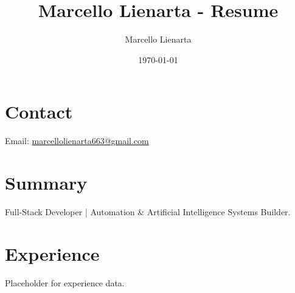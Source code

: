 \documentclass[11pt,a4paper]{article}
\title{Marcello Lienarta - Resume}
\author{Marcello Lienarta}
\date{\today}
\begin{document}
\maketitle

\section{Contact}
Email: \href{mailto:marcellolienarta663@gmail.com}{marcellolienarta663@gmail.com}

\section{Summary}
Full-Stack Developer | Automation \& Artificial Intelligence Systems Builder.

\section{Experience}
Placeholder for experience data.
\end{document}
